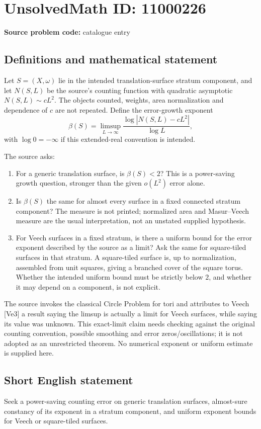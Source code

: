 \documentclass[11pt]{article}
\begin{document}
\section*{UnsolvedMath ID: 11000226}
\textbf{Source problem code:} catalogue entry
\subsection{Definitions and mathematical statement}
Let \(S=(X,\omega)\) lie in the intended translation-surface stratum component, and let \(N(S,L)\) be the source's counting function with quadratic asymptotic \(N(S,L)\sim cL^2\). The objects counted, weights, area normalization and dependence of \(c\) are not repeated. Define the error-growth exponent
\[
 \beta(S)=\limsup_{L\to\infty}
    \frac{\log|N(S,L)-cL^2|}{\log L},
\]
with \(\log0=-\infty\) if this extended-real convention is intended.

The source asks:
\begin{enumerate}
\item For a generic translation surface, is \(\beta(S)<2\)? This is a power-saving growth question, stronger than the given \(o(L^2)\) error alone.
\item Is \(\beta(S)\) the same for almost every surface in a fixed connected stratum component? The measure is not printed; normalized area and Masur--Veech measure are the usual interpretation, not an unstated supplied hypothesis.
\item For Veech surfaces in a fixed stratum, is there a uniform bound for the error exponent described by the source as a limit? Ask the same for square-tiled surfaces in that stratum. A square-tiled surface is, up to normalization, assembled from unit squares, giving a branched cover of the square torus. Whether the intended uniform bound must be strictly below \(2\), and whether it may depend on a component, is not explicit.
\end{enumerate}
The source invokes the classical Circle Problem for tori and attributes to Veech [Ve3] a result saying the limsup is actually a limit for Veech surfaces, while saying its value was unknown. This exact-limit claim needs checking against the original counting convention, possible smoothing and error zeros/oscillations; it is not adopted as an unrestricted theorem. No numerical exponent or uniform estimate is supplied here.
\subsection{Short English statement}
Seek a power-saving counting error on generic translation surfaces, almost-sure constancy of its exponent in a stratum component, and uniform exponent bounds for Veech or square-tiled surfaces.
\end{document}
